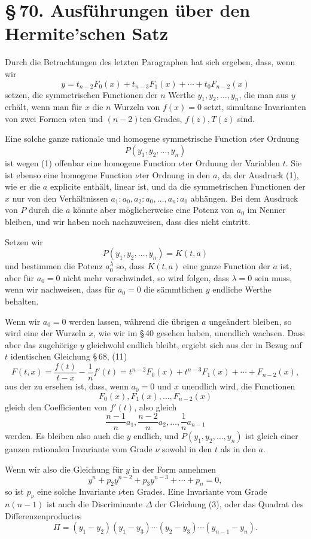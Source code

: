 \documentclass[11pt]{article}
\providecommand{\sect}[2]{\section*{\S\,#1. #2}}
\begin{document}
\sect{70}{Ausführungen über den Hermite'schen Satz}

Durch die Betrachtungen des letzten Paragraphen hat sich ergeben, dass, wenn wir
\begin{equation}
 y=t_{n-2}F_0(x)+t_{n-3}F_1(x)+\cdots+t_0F_{n-2}(x)
\tag{1}
\end{equation}
setzen, die symmetrischen Functionen der $n$ Werthe $y_1,y_2,\ldots,y_n$, die man aus $y$ erhält, wenn man für $x$ die $n$ Wurzeln von $f(x)=0$ setzt, simultane Invarianten von zwei Formen $n$ten und $(n-2)$ten Grades, $f(z),T(z)$ sind.

Eine solche ganze rationale und homogene symmetrische Function $\nu$ter Ordnung
\[
 P(y_1,y_2,\ldots,y_n)
\]
ist wegen (1) offenbar eine homogene Function $\nu$ter Ordnung der Variablen $t$. Sie ist ebenso eine homogene Function $\nu$ter Ordnung in den $a$, da der Ausdruck (1), wie er die $a$ explicite enthält, linear ist, und da die symmetrischen Functionen der $x$ nur von den Verhältnissen $a_1:a_0,a_2:a_0,\ldots,a_n:a_0$ abhängen. Bei dem Ausdruck von $P$ durch die $a$ könnte aber möglicherweise eine Potenz von $a_0$ im Nenner bleiben, und wir haben noch nachzuweisen, dass dies nicht eintritt.

Setzen wir
\[
 P(y_1,y_2,\ldots,y_n)=K(t,a)
\]
und bestimmen die Potenz $a_0^\lambda$ so, dass $K(t,a)$ eine ganze Function der $a$ ist, aber für $a_0=0$ nicht mehr verschwindet, so wird folgen, dass $\lambda=0$ sein muss, wenn wir nachweisen, dass für $a_0=0$ die sämmtlichen $y$ endliche Werthe behalten.

Wenn wir $a_0=0$ werden lassen, während die übrigen $a$ ungeändert bleiben, so wird eine der Wurzeln $x$, wie wir im \S\,40 gesehen haben, unendlich wachsen. Dass aber das zugehörige $y$ gleichwohl endlich bleibt, ergiebt sich aus der in Bezug auf $t$ identischen Gleichung \S\,68, (11)
\begin{equation}
 F(t,x)=\frac{f(t)}{t-x}-\frac1n f'(t)=t^{n-2}F_0(x)+t^{n-3}F_1(x)+\cdots+F_{n-2}(x),
\tag{2}
\end{equation}
aus der zu ersehen ist, dass, wenn $a_0=0$ und $x$ unendlich wird, die Functionen
\[
 F_0(x),F_1(x),\ldots,F_{n-2}(x)
\]
gleich den Coefficienten von $f'(t)$, also gleich
\[
 \frac{n-1}{n}a_1,
 \frac{n-2}{n}a_2,
 \ldots,
 \frac1n a_{n-1}
\]
werden. Es bleiben also auch die $y$ endlich, und $P(y_1,y_2,
\ldots,y_n)$ ist gleich einer ganzen rationalen Invariante vom Grade $\nu$ sowohl in den $t$ als in den $a$.

Wenn wir also die Gleichung für $y$ in der Form annehmen
\begin{equation}
 y^n+p_2y^{n-2}+p_3y^{n-3}+\cdots+p_n=0,
\tag{3}
\end{equation}
so ist $p_\nu$ eine solche Invariante $\nu$ten Grades. Eine Invariante vom Grade $n(n-1)$ ist auch die Discriminante $\Delta$ der Gleichung (3), oder das Quadrat des Differenzenproductes
\begin{equation}
 \Pi=(y_1-y_2)(y_1-y_3)\cdots(y_2-y_3)\cdots(y_{n-1}-y_n).
\tag{4}
\end{equation}
\end{document}

